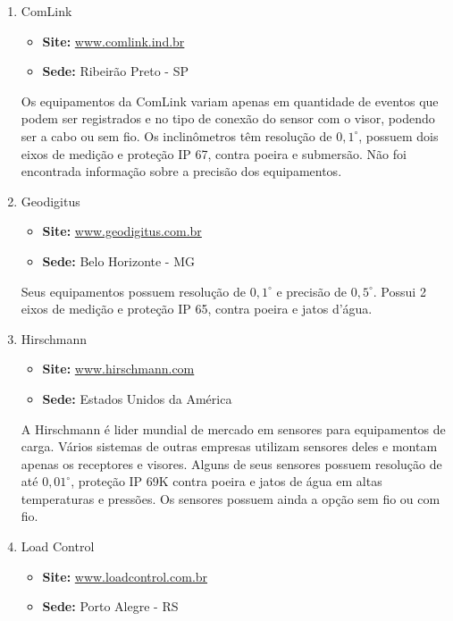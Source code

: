 \documentclass[a4paper,12pt]{article}
\newcommand{\site}[1]{\href{#1}{#1}}
\begin{document}
\begin{enumerate}
\item ComLink

\begin{itemize}
\item \textbf{Site:} \site{www.comlink.ind.br}
\item \textbf{Sede:} Ribeirão Preto - SP
\end{itemize}

Os equipamentos da ComLink variam apenas em quantidade de eventos que podem ser registrados e no tipo de conexão do sensor com o visor, podendo ser a cabo ou sem fio. Os inclinômetros têm resolução de $0,1^\circ$, possuem dois eixos de medição e proteção IP 67, contra poeira e submersão. Não foi encontrada informação sobre a precisão dos equipamentos.

\item Geodigitus

\begin{itemize}
\item \textbf{Site:} \site{www.geodigitus.com.br}
\item \textbf{Sede:} Belo Horizonte - MG
\end{itemize}

Seus equipamentos possuem resolução de $0,1^\circ$ e precisão de $0,5^\circ$. Possui 2 eixos de medição e proteção IP 65, contra poeira e jatos d'água.

\item Hirschmann

\begin{itemize}
\item \textbf{Site:} \site{www.hirschmann.com}
\item \textbf{Sede:} Estados Unidos da América
\end{itemize}

A Hirschmann é lider mundial de mercado em sensores para equipamentos de carga. Vários sistemas de outras empresas utilizam sensores deles e montam apenas os receptores e visores. Alguns de seus sensores possuem resolução de até $0,01^\circ$, proteção IP 69K contra poeira e jatos de água em altas temperaturas e pressões. Os sensores possuem ainda a opção sem fio ou com fio.

\item Load Control

\begin{itemize}
\item \textbf{Site:} \site{www.loadcontrol.com.br}
\item \textbf{Sede:} Porto Alegre - RS
\end{itemize}


\end{enumerate}
\end{document}
